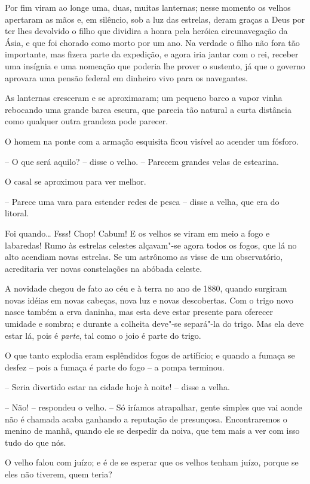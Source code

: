 Por fim viram ao longe uma, duas, muitas lanternas; nesse momento os
velhos apertaram as mãos e, em silêncio, sob a luz das estrelas, deram
graças a Deus por ter lhes devolvido o filho que dividira a honra pela
heróica circunavegação da Ásia, e que foi chorado como morto por um
ano. Na verdade o filho não fora tão importante, mas fizera parte da
expedição, e agora iria jantar com o rei, receber uma insígnia e uma
nomeação que poderia lhe prover o sustento, já que o governo aprovara
uma pensão federal em dinheiro vivo para os navegantes.

As lanternas cresceram e se aproximaram; um pequeno barco a vapor vinha
rebocando uma grande barca escura, que parecia tão natural a curta
distância como qualquer outra grandeza pode parecer. 

O homem na ponte com a armação esquisita ficou visível ao acender um
fósforo.

-- O que será aquilo? -- disse o velho. -- Parecem grandes velas de
estearina.

O casal se aproximou para ver melhor.

-- Parece uma vara para estender redes de pesca -- disse a velha, que era
do litoral.

Foi quando\ldots{} Fsss! Chop! Cabum! E os velhos se viram em meio a fogo e
labaredas! Rumo às estrelas celestes alçavam"-se agora todos os fogos,
que lá no alto acendiam novas estrelas. Se um astrônomo as visse de um
observatório, acreditaria ver novas constelações na abóbada celeste.

A novidade chegou de fato ao céu e à terra no ano de 1880, quando
surgiram novas idéias em novas cabeças, nova luz e novas descobertas.
Com o trigo novo nasce também a erva daninha, mas esta deve estar
presente para oferecer umidade e sombra; e durante a colheita deve"-se
separá"-la do trigo. Mas ela deve estar lá, pois é \textit{parte}, tal
como o joio é parte do trigo.

O que tanto explodia eram esplêndidos fogos de artifício; e quando a
fumaça se desfez -- pois a fumaça é parte do fogo -- a pompa terminou. 

-- Seria divertido estar na cidade hoje à noite! -- disse a velha.

-- Não! -- respondeu o velho. -- Só iríamos atrapalhar, gente simples que
vai aonde não é chamada acaba ganhando a reputação de presunçosa.
Encontraremos o menino de manhã, quando ele se despedir da noiva, que
tem mais a ver com isso tudo do que nós.

O velho falou com juízo; e é de se esperar que os velhos tenham juízo,
porque se eles não tiverem, quem teria? 

